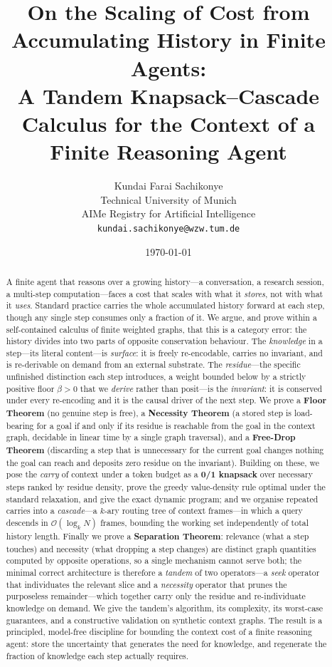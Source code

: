 \documentclass[11pt,twocolumn,a4paper]{article}
\title{\textbf{On the Scaling of Cost from Accumulating History in Finite Agents:\\[3pt]
A Tandem Knapsack--Cascade Calculus for the Context of a\\
Finite Reasoning Agent}}
\author{%
Kundai Farai Sachikonye\\
\small Technical University of Munich\\
\small AIMe Registry for Artificial Intelligence\\
\small \texttt{kundai.sachikonye@wzw.tum.de}}
\date{\today}
\theoremstyle{thmstyle}
\theoremstyle{definition}
\theoremstyle{remark}
\newcommand{\flo}{\beta}                %
\begin{document}
\maketitle

\begin{abstract}
\noindent
A finite agent that reasons over a growing history---a conversation, a
research session, a multi-step computation---faces a cost that scales with
what it \emph{stores}, not with what it \emph{uses}. Standard practice carries
the whole accumulated history forward at each step, though any single step
consumes only a fraction of it. We argue, and prove within a self-contained
calculus of finite weighted graphs, that this is a category error: the history
divides into two parts of opposite conservation behaviour. The
\emph{knowledge} in a step---its literal content---is \emph{surface}: it is
freely re-encodable, carries no invariant, and is re-derivable on demand from
an external substrate. The \emph{residue}---the specific unfinished distinction
each step introduces, a weight bounded below by a strictly positive floor
$\flo>0$ that we \emph{derive} rather than posit---is the \emph{invariant}: it
is conserved under every re-encoding and it is the causal driver of the next
step. We prove a \textbf{Floor Theorem} (no genuine step is free), a
\textbf{Necessity Theorem} (a stored step is load-bearing for a goal if and
only if its residue is reachable from the goal in the context graph, decidable
in linear time by a single graph traversal), and a \textbf{Free-Drop Theorem}
(discarding a step that is unnecessary for the current goal changes nothing the
goal can reach and deposits zero residue on the invariant). Building on these,
we pose the \emph{carry} of context under a token budget as a \textbf{0/1
knapsack} over necessary steps ranked by residue density, prove the greedy
value-density rule optimal under the standard relaxation, and give the exact
dynamic program; and we organise repeated carries into a \emph{cascade}---a
$k$-ary routing tree of context frames---in which a query descends in
$\mathcal{O}(\log_k N)$ frames, bounding the working set independently of total
history length. Finally we prove a \textbf{Separation Theorem}: relevance
(what a step touches) and necessity (what dropping a step changes) are distinct
graph quantities computed by opposite operations, so a single mechanism cannot
serve both; the minimal correct architecture is therefore a \emph{tandem} of
two operators---a \emph{seek} operator that individuates the relevant slice and
a \emph{necessity} operator that prunes the purposeless remainder---which
together carry only the residue and re-individuate knowledge on demand. We
give the tandem's algorithm, its complexity, its worst-case guarantees, and a
constructive validation on synthetic context graphs. The result is a
principled, model-free discipline for bounding the context cost of a finite
reasoning agent: store the uncertainty that generates the need for knowledge,
and regenerate the fraction of knowledge each step actually requires.
\end{abstract}
\end{document}
